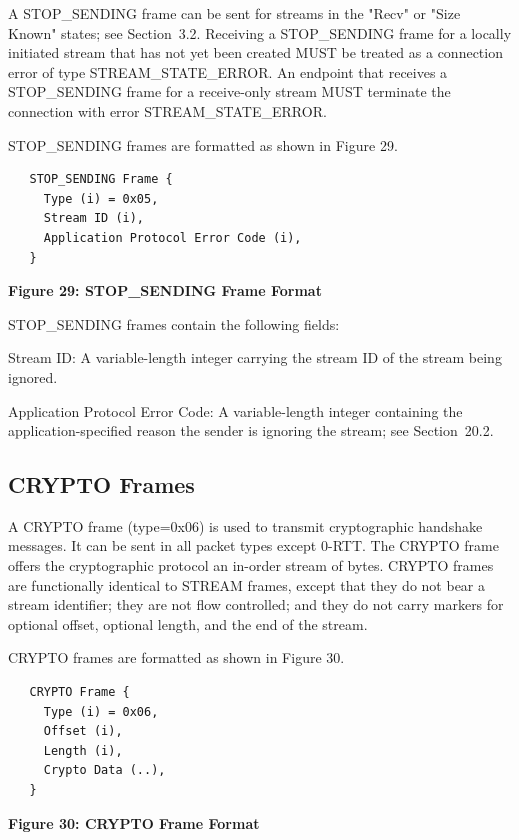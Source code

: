 \documentclass{article}
\begin{document}
A STOP\_SENDING frame can be sent for streams in the "Recv" or "Size Known" states; see Section~3.2.  Receiving a STOP\_SENDING frame for a locally initiated stream that has not yet been created MUST be treated as a connection error of type STREAM\_STATE\_ERROR.  An endpoint that receives a STOP\_SENDING frame for a receive-only stream MUST terminate the connection with error STREAM\_STATE\_ERROR.

STOP\_SENDING frames are formatted as shown in Figure 29.

\begin{verbatim}
   STOP_SENDING Frame {
     Type (i) = 0x05,
     Stream ID (i),
     Application Protocol Error Code (i),
   }
\end{verbatim}

\begin{center}
\textbf{Figure 29: STOP\_SENDING Frame Format}
\end{center}

STOP\_SENDING frames contain the following fields:

Stream ID:  A variable-length integer carrying the stream ID of the stream being ignored.

Application Protocol Error Code:  A variable-length integer containing the application-specified reason the sender is ignoring the stream; see Section~20.2.

\subsection{CRYPTO Frames}

A CRYPTO frame (type=0x06) is used to transmit cryptographic handshake messages.  It can be sent in all packet types except 0-RTT. The CRYPTO frame offers the cryptographic protocol an in-order stream of bytes.  CRYPTO frames are functionally identical to STREAM frames, except that they do not bear a stream identifier; they are not flow controlled; and they do not carry markers for optional offset, optional length, and the end of the stream.

CRYPTO frames are formatted as shown in Figure 30.

\begin{verbatim}
   CRYPTO Frame {
     Type (i) = 0x06,
     Offset (i),
     Length (i),
     Crypto Data (..),
   }
\end{verbatim}

\begin{center}
\textbf{Figure 30: CRYPTO Frame Format}
\end{center}
\end{document}
